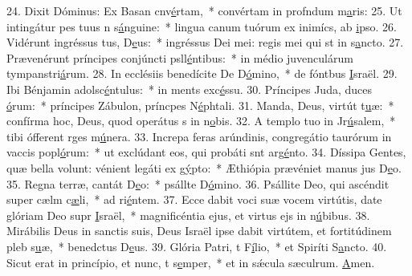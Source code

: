 24. Dixit Dóminus: Ex Basan cnv\uline{é}rtam,~* convértam in profndum m\uline{a}ris:
25. Ut intingátur pes tuus n s\uline{á}nguine:~* lingua canum tuórum ex inimícs, ab \uline{i}pso.
26. Vidérunt ingréssus tus, D\uline{e}us:~* ingréssus Dei mei: regis mei qui st in s\uline{a}ncto.
27. Prævenérunt príncipes conjúncti psll\uline{é}ntibus:~* in médio juvenculárum tympanstri\uline{á}rum.
28. In ecclésiis benedícite De D\uline{ó}mino,~* de fóntbus \uline{I}sraël.
29. Ibi Bénjamin adolsc\uline{é}ntulus:~* in ments exc\uline{é}ssu.
30. Príncipes Juda, duces \uline{ó}rum:~* príncipes Zábulon, príncpes N\uline{é}phtali.
31. Manda, Deus, virtút t\uline{u}æ:~* confírma hoc, Deus, quod operátus s in n\uline{o}bis.
32. A templo tuo in Jr\uline{ú}salem,~* tibi ófferent rges m\uline{ú}nera.
33. Increpa feras arúndinis, congregátio taurórum in vaccis popl\uline{ó}rum:~* ut exclúdant eos, qui probáti snt arg\uline{é}nto.
34. Díssipa Gentes, quæ bella volunt: vénient legáti ex g\uline{ý}pto:~* Æthiópia prævéniet manus jus D\uline{e}o.
35. Regna terræ, cantát D\uline{e}o:~* psállte D\uline{ó}mino.
36. Psállite Deo, qui ascéndit super cælm c\uline{æ}li,~* ad ri\uline{é}ntem.
37. Ecce dabit voci suæ vocem virtútis, date glóriam Deo supr \uline{I}sraël,~* magnificéntia ejus, et virtus ejs in n\uline{ú}bibus.
38. Mirábilis Deus in sanctis suis, Deus Israël ipse dabit virtútem, et fortitúdinem pleb s\uline{u}æ,~* benedctus D\uline{e}us.
39. Glória Patri, t F\uline{í}lio,~* et Spiríti S\uline{a}ncto.
40. Sicut erat in princípio, et nunc, t s\uline{e}mper,~* et in sǽcula sæculrum. \uline{A}men.
